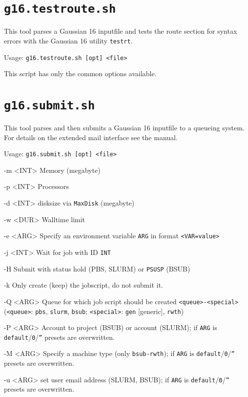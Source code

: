 \documentclass[final, a4paper, columns=3, margin=1.0cm, 10pt]{refcard}
\begin{document}
\section{\texttt{g16.testroute.sh}}

This tool parses a Gaussian 16 inputfile and 
tests the route section for syntax errors 
with the Gaussian 16 utility \texttt{testrt}.

Usage: \texttt{g16.testroute.sh [opt] <file>}

This script has only the common options available.

\section{\texttt{g16.submit.sh}}

This tool parses and then submits a Gaussian 16 inputfile to a queueing system.
For details on the extended mail interface see the manual.

Usage: \texttt{g16.submit.sh [opt] <file>}

\begin{refcardlist}[labelfont=\ttfamily]
  \item[-m <INT>] Memory (megabyte)
  \item[-p <INT>] Processors
  \item[-d <INT>] disksize via \texttt{MaxDisk} (megabyte)
  \item[-w <DUR>] Walltime limit
  \item[-e <ARG>] Specify an environment variable \texttt{ARG} in format \texttt{<VAR=value>}
  \item[-j <INT>] Wait for job with ID \texttt{INT}
  \item[-H      ] Submit with status hold (PBS, SLURM) or \texttt{PSUSP} (BSUB)
  \item[-k      ] Only create (keep) the jobscript, do not submit it.
  \item[-Q <ARG>] Queue for which job script should be created \texttt{<queue>-<special>}
    (\texttt{<queue>}: \texttt{pbs}, \texttt{slurm}, \texttt{bsub};
     \texttt{<special>}: \texttt{gen} [generic], \texttt{rwth})
  \item[-P <ARG>] Account to project (BSUB) or account (SLURM);
    if \texttt{ARG} is \texttt{default}/\texttt{0}/\texttt{''} presets are overwritten.
  \item[-M <ARG>] Specify a machine type (only \texttt{bsub-rwth});
    if \texttt{ARG} is \texttt{default}/\texttt{0}/\texttt{''} presets are overwritten.
  \item[-u <ARG>] set user email address (SLURM, BSUB);
    if \texttt{ARG} is \texttt{default}/\texttt{0}/\texttt{''} presets are overwritten.
\end{refcardlist}
\end{document}
